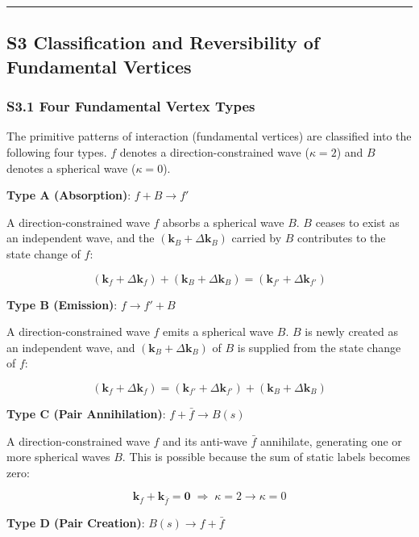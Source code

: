 \documentclass[
  a4paper,11pt]{article}
\theoremstyle{definition}
\theoremstyle{remark}
\begin{document}
\begin{center}\rule{0.5\linewidth}{0.5pt}\end{center}

\subsection{S3 Classification and Reversibility of Fundamental
Vertices}\label{s3-classification-and-reversibility-of-fundamental-vertices}

\subsubsection{S3.1 Four Fundamental Vertex
Types}\label{s3.1-four-fundamental-vertex-types}

The primitive patterns of interaction (fundamental vertices) are
classified into the following four types. \(f\) denotes a
direction-constrained wave (\(\kappa = 2\)) and \(B\) denotes a
spherical wave (\(\kappa = 0\)).

\textbf{Type A (Absorption)}: \(f + B \longrightarrow f'\)

A direction-constrained wave \(f\) absorbs a spherical wave \(B\). \(B\)
ceases to exist as an independent wave, and the
\((\mathbf{k}_B + \Delta\mathbf{k}_B)\) carried by \(B\) contributes to
the state change of \(f\):

\[(\mathbf{k}_f + \Delta\mathbf{k}_f) + (\mathbf{k}_B + \Delta\mathbf{k}_B) = (\mathbf{k}_{f'} + \Delta\mathbf{k}_{f'})\]

\textbf{Type B (Emission)}: \(f \longrightarrow f' + B\)

A direction-constrained wave \(f\) emits a spherical wave \(B\). \(B\)
is newly created as an independent wave, and
\((\mathbf{k}_B + \Delta\mathbf{k}_B)\) of \(B\) is supplied from the
state change of \(f\):

\[(\mathbf{k}_f + \Delta\mathbf{k}_f) = (\mathbf{k}_{f'} + \Delta\mathbf{k}_{f'}) + (\mathbf{k}_B + \Delta\mathbf{k}_B)\]

\textbf{Type C (Pair Annihilation)}:
\(f + \bar{f} \longrightarrow B(s)\)

A direction-constrained wave \(f\) and its anti-wave \(\bar{f}\)
annihilate, generating one or more spherical waves \(B\). This is
possible because the sum of static labels becomes zero:

\[\mathbf{k}_f + \mathbf{k}_{\bar{f}} = \mathbf{0} \;\Longrightarrow\; \kappa = 2 \to \kappa = 0\]

\textbf{Type D (Pair Creation)}: \(B(s) \longrightarrow f + \bar{f}\)
\end{document}
